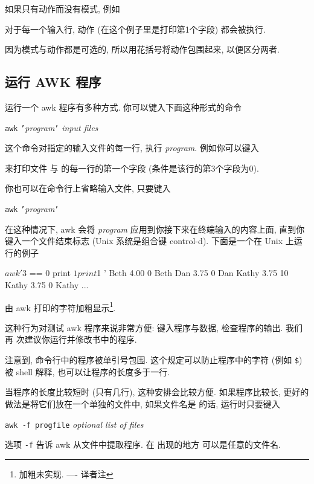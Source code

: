 如果只有动作而没有模式, 例如
对于每一个输入行, 动作 (在这个例子里是打印第1个字段) 都会被执行.

因为模式与动作都是可选的, 所以用花括号将动作包围起来, 以便区分两者.

\subsection{运行 AWK 程序}
\label{running_an_awk_program}

运行一个 awk 程序有多种方式. 你可以键入下面这种形式的命令
\begin{pattern}
    \texttt{awk} \texttt{'}\textit{program}\texttt{'} \textit{input files}
\end{pattern}
这个命令对指定的输入文件的每一行, 执行 \textit{program}. 例如你可以键入
来打印文件  与  的每一行的第一个字段
(条件是该行的第3个字段为0).

你也可以在命令行上省略输入文件, 只要键入
\begin{pattern}
    \texttt{awk} \texttt{'}\textit{program}\texttt{'}
\end{pattern}
在这种情况下, awk 会将 \textit{program} 应用到你接下来在终端输入的内容上面,
直到你键入一个文件结束标志 (Unix 系统是组合键 control-d). 下面是一个在 Unix
上运行的例子
\begin{shell}
    $ awk '$3 == 0 { print $1 print $1 }'
    Beth    4.00    0
    Beth
    Dan     3.75    0
    Dan
    Kathy   3.75    10
    Kathy   3.75    0
    Kathy
    ...
\end{shell}
由 awk 打印的字符加粗显示\footnote{加粗未实现. ---- 译者注}.

这种行为对测试 awk 程序来说非常方便: 键入程序与数据, 检查程序的输出. 我们再
次建议你运行并修改书中的程序.

注意到, 命令行中的程序被单引号包围. 这个规定可以防止程序中的字符 (例如
\verb'$') 被 shell 解释, 也可以让程序的长度多于一行.

当程序的长度比较短时 (只有几行), 这种安排会比较方便. 如果程序比较长, 更好的
做法是将它们放在一个单独的文件中, 如果文件名是  的话,
运行时只要键入
\begin{pattern}
    \texttt{awk -f progfile} \textit{optional list of files}
\end{pattern}
选项 \verb'-f' 告诉 awk 从文件中提取程序. 在  出现的地方
可以是任意的文件名.

